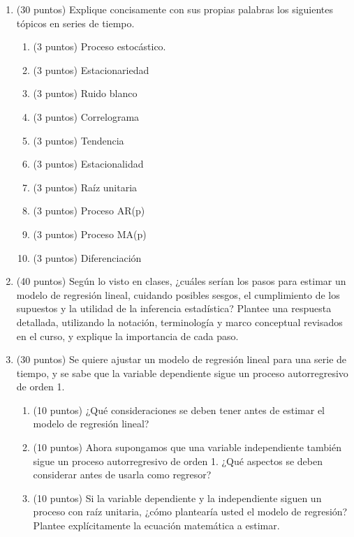 \documentclass[10pt,a4paper]{article}
\begin{document}
 
\begin{enumerate}

    \item (30 puntos) Explique concisamente con sus propias palabras los siguientes tópicos en series de tiempo.
    \begin{enumerate}
        \item (3 puntos) Proceso estocástico.
        \item (3 puntos) Estacionariedad 
        \item (3 puntos) Ruido blanco
        \item (3 puntos) Correlograma
        \item (3 puntos) Tendencia
        \item (3 puntos) Estacionalidad
        \item (3 puntos) Raíz unitaria
        \item (3 puntos) Proceso AR(p)
        \item (3 puntos) Proceso MA(p)
        \item (3 puntos) Diferenciación
    \end{enumerate}

    \item (40 puntos) Según lo visto en clases, ¿cuáles serían los pasos para estimar un modelo de regresión lineal, cuidando posibles sesgos, el cumplimiento de los supuestos y la utilidad de la inferencia estadística? Plantee una respuesta detallada, utilizando la notación, terminología y marco conceptual revisados en el curso, y explique la importancia de cada paso.

    \item (30 puntos) Se quiere ajustar un modelo de regresión lineal para
una serie de tiempo, y se sabe que la variable dependiente sigue un
proceso autorregresivo de orden 1.
\begin{enumerate}
    \item (10 puntos) ¿Qué consideraciones se deben tener antes de estimar el
    modelo de regresión lineal?
    \item (10 puntos) Ahora supongamos que una variable independiente también sigue
    un proceso autorregresivo de orden 1. ¿Qué aspectos se deben
    considerar antes de usarla como regresor?
    \item (10 puntos) Si la variable dependiente y la independiente siguen un
    proceso con raíz unitaria, ¿cómo plantearía usted el modelo de
    regresión? Plantee explícitamente la ecuación matemática a estimar.
\end{enumerate}

\end{enumerate}
\end{document}
